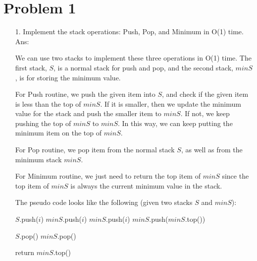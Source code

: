 \section*{Problem 1}
\begin{enumerate}

\item [1.] Implement the stack operations: Push, Pop, and Minimum in O(1) time. \\
Ans:

We can use two stacks to implement these three operations in O(1) time.  The first stack, $S$, is a normal stack for push and pop, and the second stack, $minS$, is for storing the minimum value.

For Push routine, we push the given item into $S$, and check if the given item is less than the top of $minS$.  If it is smaller, then we update the minimum value for the stack and push the smaller item to $minS$.  If not, we keep pushing the top of $minS$ to $minS$.  In this way, we can keep putting the minimum item on the top of $minS$.

For Pop routine, we pop item from the normal stack $S$, as well as from the minimum stack $minS$.

For Minimum routine, we just need to return the top item of $minS$ since the top item of $minS$ is always the current minimum value in the stack.

The pseudo code looks like the following (given two stacks $S$ and $minS$):

\begin{algorithmic}[0]
    \State $S$.push($i$) 
        \State $minS$.push($i$) 
    \Else
            \State $minS$.push($i$) 
        \Else
            \State $minS$.push($minS$.top()) 
        \EndIf
    \EndIf
\EndProcedure
\end{algorithmic}


\begin{algorithmic}[0]
    \State $S$.pop() 
    \State $minS$.pop() 
\EndProcedure
\end{algorithmic}


\begin{algorithmic}[0]
    \State return $minS$.top() 
\EndProcedure
\end{algorithmic}


\end{enumerate}
